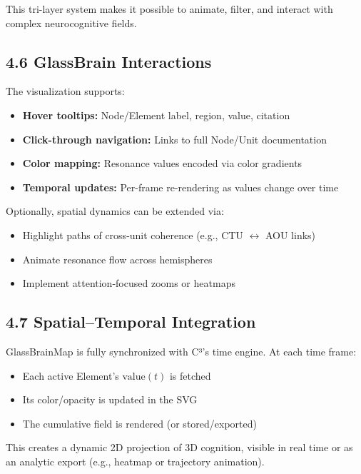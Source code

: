 This tri-layer system makes it possible to animate, filter, and interact with complex neurocognitive fields.

\subsection*{4.6 GlassBrain Interactions}

The visualization supports:

\begin{itemize}
    \item \textbf{Hover tooltips:} Node/Element label, region, value, citation
    \item \textbf{Click-through navigation:} Links to full Node/Unit documentation
    \item \textbf{Color mapping:} Resonance values encoded via color gradients
    \item \textbf{Temporal updates:} Per-frame re-rendering as values change over time
\end{itemize}

Optionally, spatial dynamics can be extended via:

\begin{itemize}
    \item Highlight paths of cross-unit coherence (e.g., CTU $\leftrightarrow$ AOU links)
    \item Animate resonance flow across hemispheres
    \item Implement attention-focused zooms or heatmaps
\end{itemize}

\subsection*{4.7 Spatial–Temporal Integration}

GlassBrainMap is fully synchronized with C³'s time engine. At each time frame:

\begin{itemize}
    \item Each active Element’s $\text{value}(t)$ is fetched
    \item Its color/opacity is updated in the SVG
    \item The cumulative field is rendered (or stored/exported)
\end{itemize}

This creates a dynamic 2D projection of 3D cognition, visible in real time or as an analytic export (e.g., heatmap or trajectory animation).

